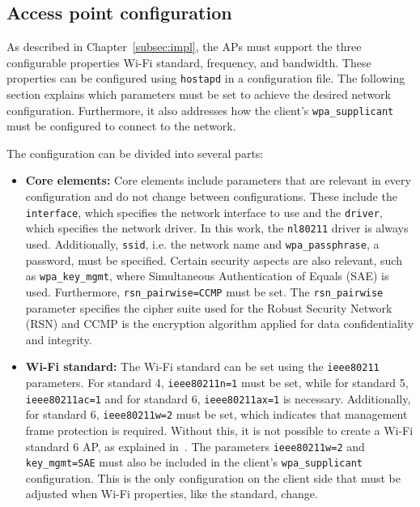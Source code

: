 \subsection{Access point configuration} \label{subsec:hostapd}
As described in Chapter~\ref{subsec:impl}, the \acp{AP} must support the three configurable properties Wi-Fi standard, frequency, and bandwidth.  
These properties can be configured using \texttt{hostapd} in a configuration file.  
The following section explains which parameters must be set to achieve the desired network configuration.  
Furthermore, it also addresses how the client’s \texttt{wpa\_supplicant} must be configured to connect to the network.  

The configuration can be divided into several parts:  
\begin{itemize}
    \item \textbf{Core elements:} Core elements include parameters that are relevant in every configuration and do not change between configurations.  
          These include the \texttt{interface}, which specifies the network interface to use and the \texttt{driver}, which specifies the network driver.
          In this work, the \texttt{nl80211} driver is always used.  
          Additionally, \texttt{ssid}, i.e. the network name and \texttt{wpa\_passphrase}, a password, must be specified.  
          Certain security aspects are also relevant, such as \texttt{wpa\_key\_mgmt}, where Simultaneous Authentication of Equals (SAE) is used.  
          Furthermore, \texttt{rsn\_pairwise=CCMP} must be set.  
          The \texttt{rsn\_pairwise} parameter specifies the cipher suite used for the Robust Security Network (RSN) and CCMP is the encryption algorithm applied for data confidentiality and integrity.
          
    \item \textbf{Wi-Fi standard:} The Wi-Fi standard can be set using the \texttt{ieee80211} parameters.  
          For standard 4, \texttt{ieee80211n=1} must be set, while for standard 5, \texttt{ieee80211ac=1} and for standard 6, \texttt{ieee80211ax=1} is necessary.  
          Additionally, for standard 6, \texttt{ieee80211w=2} must be set, which indicates that management frame protection is required.  
          Without this, it is not possible to create a Wi-Fi standard 6 \ac{AP}, as explained in~\cite{hostapd-config}.  
          The parameters \texttt{ieee80211w=2} and \texttt{key\_mgmt=SAE} must also be included in the client’s \texttt{wpa\_supplicant} configuration.  
          This is the only configuration on the client side that must be adjusted when Wi-Fi properties, like the standard, change.


\end{itemize}
